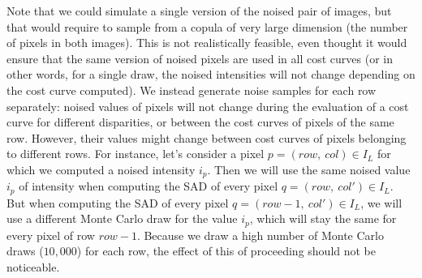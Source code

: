 Note that we could simulate a single version of the noised pair of images, but that would require to sample from a copula of very large dimension (the number of pixels in both images). This is not realistically feasible, even thought it would ensure that the same version of noised pixels are used in all cost curves (or in other words, for a single draw, the noised intensities will not change depending on the cost curve computed). We instead generate noise samples for each row separately: noised values of pixels will not change during the evaluation of a cost curve for different disparities, or between the cost curves of pixels of the same row. However, their values might change between cost curves of pixels belonging to different rows. For instance, let's consider a pixel $p=(row,~col)\in I_L$ for which we computed a noised intensity $i_p$. Then we will use the same noised value $i_p$ of intensity when computing the SAD of every pixel $q=(row,~col')\in I_L$. But when computing the SAD of every pixel $q=(row-1,~col')\in I_L$, we will use a different Monte Carlo draw for the value $i_p$, which will stay the same for every pixel of row $row-1$. Because we draw a high number of Monte Carlo draws ($10,000$) for each row, the effect of this of proceeding should not be noticeable. 

